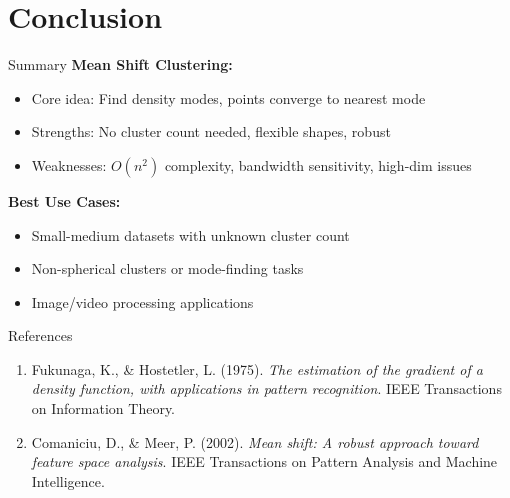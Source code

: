 \section{Conclusion}

\begin{frame}{Summary}
    \textbf{Mean Shift Clustering:}
    \begin{itemize}
        \item \textcolor{customred}{Core idea:} Find density modes, points converge to nearest mode
        \item \textcolor{customred}{Strengths:} No cluster count needed, flexible shapes, robust
        \item \textcolor{customred}{Weaknesses:} $O(n^2)$ complexity, bandwidth sensitivity, high-dim issues
    \end{itemize}

    \vspace{0.5cm}



    \textbf{Best Use Cases:}
    \begin{itemize}
        \item Small-medium datasets with unknown cluster count
        \item Non-spherical clusters or mode-finding tasks
        \item Image/video processing applications
    \end{itemize}
\end{frame}

\begin{frame}{References}
    \begin{enumerate}
        \item Fukunaga, K., \& Hostetler, L. (1975). \textit{The estimation of the gradient of a density function, with applications in pattern recognition}. IEEE Transactions on Information Theory.

        \item Comaniciu, D., \& Meer, P. (2002). \textit{Mean shift: A robust approach toward feature space analysis}. IEEE Transactions on Pattern Analysis and Machine Intelligence.

    \end{enumerate}
\end{frame}

